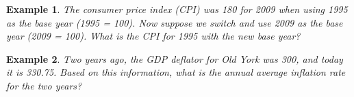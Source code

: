 \documentclass[12pt]{article}
\newtheorem{example}{Example}
\numberwithin{equation}{section}
\begin{document}
\begin{example}
    The consumer price index (CPI) was 180 for 2009 when using 1995 as the base year (1995 = 100). Now suppose we switch and use 2009 as the base year (2009 = 100). What is the CPI for 1995 with the new base year?
\end{example}

\vspace{36pt}

\begin{example}
    Two years ago, the GDP deflator for Old York was 300, and today it is 330.75. Based on this information, what is the annual average inflation rate for the two years?
\end{example}
\end{document}

